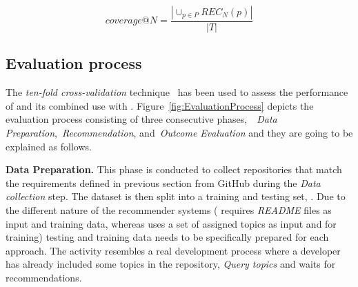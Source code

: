 \begin{equation}\label{eqn:Coverage}
coverage@N = \frac{\left | \cup_{p\in P} REC_{N}(p) \right | }{\left | T \right |} 
\end{equation}






\subsection{Evaluation process}\label{sec:methodology-metric}



The \emph{ten-fold cross-validation} technique~\cite{kohavi1995study} has been 
used to assess the performance of \TF and its combined use with \MNB. %
%
Figure~\ref{fig:EvaluationProcess} depicts the evaluation process consisting of 
three consecutive phases,~\ie~\emph{Data Preparation},~\emph{Recommendation}, 
and~\emph{Outcome Evaluation} and they are going to be explained as follows.

\vspace{.1cm}
\noindent\textbf{Data Preparation.}
This phase is conducted to collect repositories that match the requirements defined in previous section from GitHub during the \textit{Data collection} step. %
The dataset is then split into a training and testing set, \ie {}. Due to the different nature of the recommender systems (\ie \MNB 
requires \textit{README} files as input and training data, whereas \TF uses a 
set of assigned topics as input and for training) testing and training 
data needs to be specifically prepared for each approach.
The  activity resembles a real development process where a developer has already included some topics in the repository, \ie \textit{Query topics} and waits for recommendations. 


